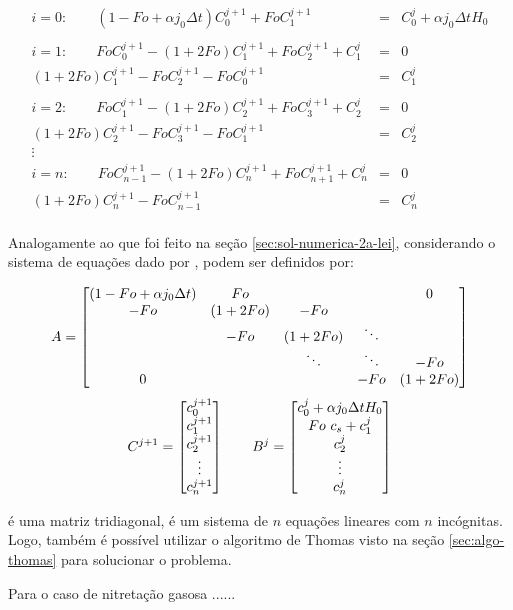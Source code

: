 \begin{equation*}
\label{eq:depoisFo}
\begin{matrix}
i = 0: \qquad (1- Fo + \alpha j_0 \Delta t)C_0^{j+1} + FoC_{1}^{j+1} & = & C_0^j + \alpha j_0 \Delta t H_0 \\
\\
i = 1: \qquad FoC_{0}^{j+1} - (1+2Fo)C_1^{j+1} + FoC_{2}^{j+1} + C_1^j & = & 0\\
(1+2Fo)C_1^{j+1} - FoC_{2}^{j+1} - FoC_{0}^{j+1} & = & C_1^j \\ 
\\
i = 2: \qquad FoC_{1}^{j+1} - (1+2Fo)C_2^{j+1} + FoC_{3}^{j+1} + C_2^j & = & 0\\
(1+2Fo)C_2^{j+1} - FoC_{3}^{j+1} - FoC_{1}^{j+1} & = & C_2^j \\ 
\vdots \\
i = n: \qquad FoC_{n-1}^{j+1} - (1+2Fo)C_n^{j+1} + FoC_{n+1}^{j+1} + C_n^j & = & 0\\
(1+2Fo)C_n^{j+1} - FoC_{n-1}^{j+1} & = & C_n^j \\
\end{matrix}
\end{equation*}

Analogamente ao que foi feito na seção \ref{sec:sol-numerica-2a-lei}, considerando o sistema de equações dado por ,  podem ser definidos por:

\begin{equation*}
	\cmrtext{A} =
	\begin{bmatrix}
		(1- Fo + \alpha j_0 \Delta t) & Fo &         &        & 0\\
		-Fo & (1+2Fo) &  -Fo   &        & \\
		    & -Fo &   (1+2Fo)   & \ddots & \\
		    &     &  \ddots & \ddots & -Fo \\
	     0  &     &         &  -Fo   & (1+2Fo) 
	\end{bmatrix}
\end{equation*}
\begin{equation*}
	\cmrtext{C^{j+1}} =
	\begin{bmatrix}
		c_0^{j+1} \\
		c_1^{j+1} \\
		c_2^{j+1} \\
		\vdots \\
		c_n^{j+1}
	\end{bmatrix}
	\qquad
	\cmrtext{B^j} =	
	\begin{bmatrix}
	c_0^j + \alpha j_0 \Delta t H_0 \\
		Fo\ c_s+c_1^j \\
		c_2^{j} \\
		\vdots \\
		c_n^{j}
	\end{bmatrix}
\end{equation*}

 é uma matriz tridiagonal,  é um sistema de $n$ equações lineares com $n$ incógnitas. Logo, também é possível utilizar o algoritmo de Thomas visto na seção \ref{sec:algo-thomas} para solucionar o problema.

Para o caso de nitretação gasosa ......
